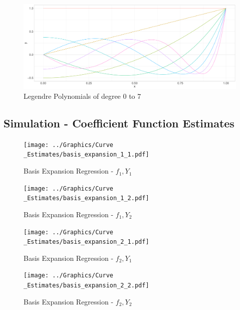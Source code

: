 \documentclass[11pt,twoside,a4paper]{article}
\begin{document}
	\begin{figure}[H]\label{Legendre_basis}
		\includegraphics[width = \textwidth]{../Graphics/Legendre_Plot.pdf}
		\caption{Legendre Polynomials of degree 0 to 7}
	\end{figure}

	
	
	\newpage
	\subsection{Simulation - Coefficient Function Estimates}\label{Estimates_sim}
	
	\begin{figure}[H]
		\centering
		\begin{minipage}{.5\textwidth}
			\centering
			\texttt{[image: ../Graphics/Curve\\\_Estimates/basis\_expansion\_1\_1.pdf]}
			\caption{Basis Expansion Regression - $f_1, Y_1$}
			\label{basis_expansion_1_1}
		\end{minipage}%
		\begin{minipage}{.5\textwidth}
			\centering
			\texttt{[image: ../Graphics/Curve\\\_Estimates/basis\_expansion\_1\_2.pdf]}
			\caption{Basis Expansion Regression - $f_1, Y_2$}
			\label{basis_expansion_1_2}
		\end{minipage}
	\end{figure}
	
	\begin{figure}[H]
		\centering
		\begin{minipage}{.5\textwidth}
			\centering
			\texttt{[image: ../Graphics/Curve\\\_Estimates/basis\_expansion\_2\_1.pdf]}
			\caption{Basis Expansion Regression - $f_2, Y_1$}
			\label{basis_expansion_2_1}
		\end{minipage}%
		\begin{minipage}{.5\textwidth}
			\centering
			\texttt{[image: ../Graphics/Curve\\\_Estimates/basis\_expansion\_2\_2.pdf]}
			\caption{Basis Expansion Regression - $f_2, Y_2$}
			\label{basis_expansion_2_2}
		\end{minipage}
	\end{figure}
	
\end{document}
